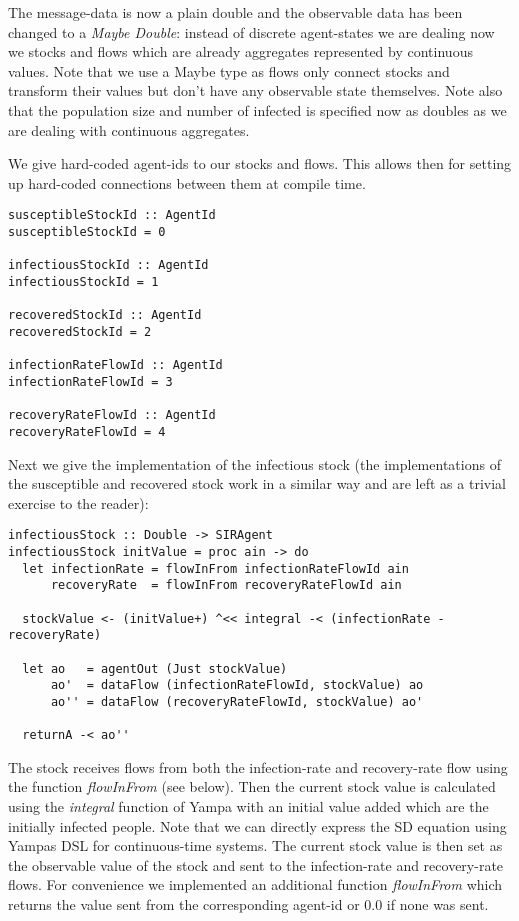 The message-data is now a plain double and the observable data has been changed to a \textit{Maybe Double}: instead of discrete agent-states we are dealing now we stocks and flows which are already aggregates represented by continuous values. Note that we use a Maybe type as flows only connect stocks and transform their values but don't have any observable state themselves. Note also that the population size and number of infected is specified now as doubles as we are dealing with continuous aggregates.

We give hard-coded agent-ids to our stocks and flows. This allows then for setting up hard-coded connections between them at compile time.
\begin{verbatim}
susceptibleStockId :: AgentId
susceptibleStockId = 0

infectiousStockId :: AgentId
infectiousStockId = 1

recoveredStockId :: AgentId
recoveredStockId = 2

infectionRateFlowId :: AgentId
infectionRateFlowId = 3

recoveryRateFlowId :: AgentId
recoveryRateFlowId = 4
\end{verbatim}

Next we give the implementation of the infectious stock (the implementations of the susceptible and recovered stock work in a similar way and are left as a trivial exercise to the reader):

\begin{verbatim}
infectiousStock :: Double -> SIRAgent
infectiousStock initValue = proc ain -> do
  let infectionRate = flowInFrom infectionRateFlowId ain
      recoveryRate  = flowInFrom recoveryRateFlowId ain

  stockValue <- (initValue+) ^<< integral -< (infectionRate - recoveryRate)
  
  let ao   = agentOut (Just stockValue)
      ao'  = dataFlow (infectionRateFlowId, stockValue) ao
      ao'' = dataFlow (recoveryRateFlowId, stockValue) ao'
      
  returnA -< ao''
\end{verbatim}

The stock receives flows from both the infection-rate and recovery-rate flow using the function \textit{flowInFrom} (see below). Then the current stock value is calculated using the \textit{integral} function of Yampa with an initial value added which are the initially infected people. Note that we can directly express the SD equation using Yampas DSL for continuous-time systems. The current stock value is then set as the observable value of the stock and sent to the infection-rate and recovery-rate flows. For convenience we implemented an additional function \textit{flowInFrom} which returns the value sent from the corresponding agent-id or 0.0 if none was sent.

